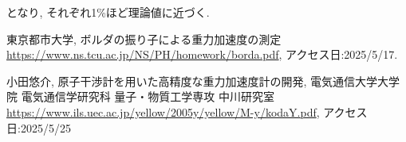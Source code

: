 \documentclass{jarticle}
\begin{document}
となり, それぞれ1\%ほど理論値に近づく.



\begin{thebibliography}{99}
  
  東京都市大学, ボルダの振り子による重力加速度の測定 \url{https://www.ns.tcu.ac.jp/NS/PH/homework/borda.pdf}, アクセス日:2025/5/17.

  小田悠介, 原子干渉計を用いた高精度な重力加速度計の開発, 電気通信大学大学院 電気通信学研究科 量子・物質工学専攻 中川研究室 \url{https://www.ils.uec.ac.jp/yellow/2005y/yellow/M-y/kodaY.pdf}, アクセス日:2025/5/25

\end{thebibliography}
\end{document}

